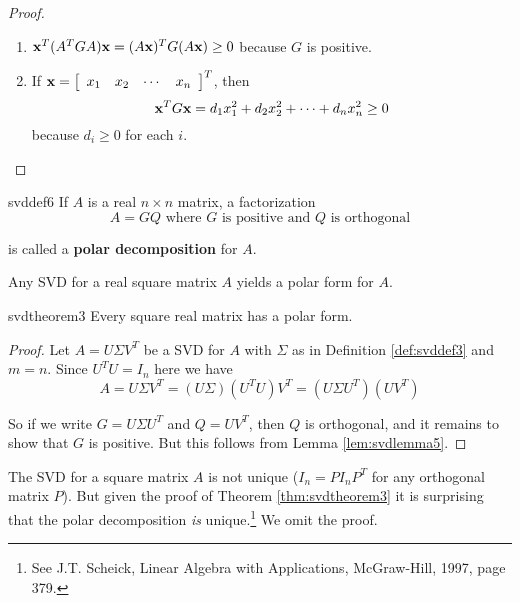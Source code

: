 \begin{proof} 
\begin{enumerate}
\item $\textbf{x}^{T}(A^{T}GA)\textbf{x}=(A\textbf{x})^{T}G(A\textbf{x})\geq 0$ because $G$ is positive.

\item If $\textbf{x}=\left[ \begin{array}{cccc}x_{1}& x_{2} & \cdots & x_{n}\end{array}\right]^{T}$, then
\begin{equation*}
\textbf{x}^{T}G\textbf{x}=d_{1}x_{1}^{2}+d_{2}x_{2}^{2}+\cdots +d_{n}x_{n}^{2}\geq 0
\end{equation*}
because $d_{i}\geq 0$ for each $i$. 
\end{enumerate}
\end{proof}

\begin{definition}{}{svddef6} 
If $A$ is a real $n\times n$ matrix, a factorization 
\begin{equation*}
A=GQ \mbox{ where } G \mbox{ is positive and } Q \mbox{ is orthogonal}
\end{equation*}

\noindent is called a \textbf{polar decomposition} for $A$.
\end{definition}

Any SVD for a real square matrix $A$ yields a polar form for $A$.

\begin{theorem}{}{svdtheorem3}
Every square real matrix has a polar form.
\end{theorem}

\begin{proof}
Let $A=U\Sigma V^{T}$ be a SVD for $A$ with $\Sigma $ as in Definition \ref{def:svddef3} and $m=n$. Since $U^{T}U=I_{n}$ here we have 
\begin{equation*}
A=U\Sigma V^{T}=(U\Sigma )(U^{T}U)V^{T}=(U\Sigma U^{T})(UV^{T})
\end{equation*}

\noindent So if we write $G=U\Sigma U^{T}$ and $Q=UV^{T}$, then $Q$ is
orthogonal, and it remains to show that $G$ is positive. But this follows
from Lemma \ref{lem:svdlemma5}.
\end{proof}

The SVD for a square matrix $A$ is not unique ($I_{n}=PI_{n}P^{T}$ for any
orthogonal matrix $P$). But given the proof of Theorem \ref{thm:svdtheorem3} it is
surprising that the polar decomposition \emph{is} unique.\footnote{See J.T. Scheick, Linear Algebra with Applications, McGraw-Hill, 1997, page
379.} We omit the proof.

